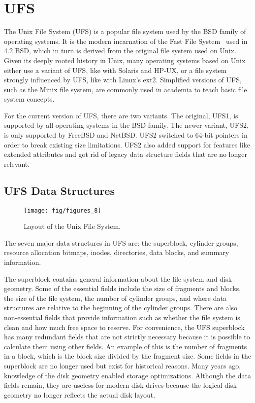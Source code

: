 \section{UFS}
\label{sec:ufs}

The Unix File System (UFS) is a popular file system used by the BSD family of
operating systems. It is the modern incarnation of the Fast File
System~\cite{mckusick84fast} used in 4.2 BSD, which in turn is derived from the
original file system used on Unix. Given its deeply rooted history in Unix,
many operating systems based on Unix either use a variant of UFS, like with
Solaris and HP-UX, or a file system strongly influenced by UFS, like with
Linux's ext2. Simplified versions of UFS, such as the Minix file system, are
commonly used in academia to teach basic file system concepts.

For the current version of UFS, there are two variants. The original, UFS1, is
supported by all operating systems in the BSD family. The newer variant, UFS2,
is only supported by FreeBSD and NetBSD. UFS2 switched to 64-bit pointers in
order to break existing size limitations. UFS2 also added support for features
like extended attributes and got rid of legacy data structure fields that are
no longer relevant.

\subsection{UFS Data Structures}
\label{sec:ufs:structs}

\begin{figure}[htb]
  \centering
  \texttt{[image: fig/figures\_8]}
  \caption{\label{fig:ufs_sb} Layout of the Unix File System.}
\end{figure}

The seven major data structures in UFS are: the superblock, cylinder groups,
resource allocation bitmaps, inodes, directories, data blocks, and summary
information.

The superblock contains general information about the file system and disk
geometry. Some of the essential fields include the size of fragments and
blocks, the size of the file system, the number of cylinder groups, and where
data structures are relative to the beginning of the cylinder groups. There
are also non-essential fields that provide information such as whether the
file system is clean and how much free space to reserve. For convenience, the
UFS superblock has many redundant fields that are not strictly necessary
because it is possible to calculate them using other fields. An example of this
is the number of fragments in a block, which is the block size divided by the
fragment size. Some fields in the superblock are no longer used but exist for
historical reasons. Many years ago, knowledge of the disk geometry enabled
storage optimizations. Although the data fields remain, they are useless for
modern disk drives because the logical disk geometry no longer reflects the
actual disk layout.

